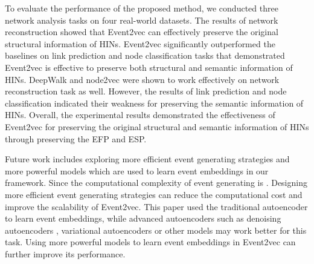 To evaluate the performance of the proposed method, we conducted three network analysis tasks on four real-world datasets. The results of network reconstruction showed that Event2vec can effectively preserve the original structural information of HINs. Event2vec significantly outperformed the baselines on link prediction and node classification tasks that demonstrated Event2vec is effective to preserve both structural and semantic information of HINs. DeepWalk and node2vec were shown to work effectively on network reconstruction task as well. However, the results of link prediction and node classification indicated their weakness for preserving the semantic information of HINs. Overall, the experimental results demonstrated the effectiveness of Event2vec for preserving the original structural and semantic information of HINs through preserving the EFP and ESP.

Future work includes exploring more efficient event generating strategies and more powerful models which are used to learn event embeddings in our framework. Since the computational complexity of event generating is . Designing more efficient event generating strategies can reduce the computational cost and improve the scalability of Event2vec. This paper used the traditional autoencoder to learn event embeddings, while advanced autoencoders such as denoising autoencoders \cite{vincent2010stacked}, variational autoencoders \cite{doersch2016tutorial} or other models may work better for this task. Using more powerful models to learn event embeddings in Event2vec can further improve its performance.
